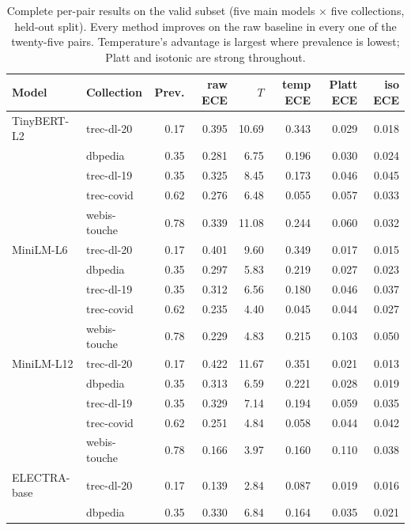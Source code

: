 \documentclass[sigconf,nonacm]{acmart}
\newcommand{\thead}[1]{\textbf{#1}}
\begin{document}
\begin{table}[t]
\centering
\caption{Complete per-pair results on the valid subset (five main models $\times$
five collections, held-out split). Every method improves on the raw baseline in every
one of the twenty-five pairs. Temperature's advantage is largest where prevalence is
lowest; Platt and isotonic are strong throughout.}\label{tab:full}
\small
\begin{tabular}{llrrrrrr}
\toprule
\thead{Model} & \thead{Collection} & \thead{Prev.} & \thead{raw ECE} & \thead{$T$} & \thead{temp ECE} & \thead{Platt ECE} & \thead{iso ECE} \\
\midrule
TinyBERT-L2 & trec-dl-20 & 0.17 & 0.395 & 10.69 & 0.343 & 0.029 & 0.018 \\
            & dbpedia    & 0.35 & 0.281 &  6.75 & 0.196 & 0.030 & 0.024 \\
            & trec-dl-19 & 0.35 & 0.325 &  8.45 & 0.173 & 0.046 & 0.045 \\
            & trec-covid & 0.62 & 0.276 &  6.48 & 0.055 & 0.057 & 0.033 \\
            & webis-touche & 0.78 & 0.339 & 11.08 & 0.244 & 0.060 & 0.032 \\
\midrule
MiniLM-L6   & trec-dl-20 & 0.17 & 0.401 &  9.60 & 0.349 & 0.017 & 0.015 \\
            & dbpedia    & 0.35 & 0.297 &  5.83 & 0.219 & 0.027 & 0.023 \\
            & trec-dl-19 & 0.35 & 0.312 &  6.56 & 0.180 & 0.046 & 0.037 \\
            & trec-covid & 0.62 & 0.235 &  4.40 & 0.045 & 0.044 & 0.027 \\
            & webis-touche & 0.78 & 0.229 &  4.83 & 0.215 & 0.103 & 0.050 \\
\midrule
MiniLM-L12  & trec-dl-20 & 0.17 & 0.422 & 11.67 & 0.351 & 0.021 & 0.013 \\
            & dbpedia    & 0.35 & 0.313 &  6.59 & 0.221 & 0.028 & 0.019 \\
            & trec-dl-19 & 0.35 & 0.329 &  7.14 & 0.194 & 0.059 & 0.035 \\
            & trec-covid & 0.62 & 0.251 &  4.84 & 0.058 & 0.044 & 0.042 \\
            & webis-touche & 0.78 & 0.166 &  3.97 & 0.160 & 0.110 & 0.038 \\
\midrule
ELECTRA-base& trec-dl-20 & 0.17 & 0.139 &  2.84 & 0.087 & 0.019 & 0.016 \\
            & dbpedia    & 0.35 & 0.330 &  6.84 & 0.164 & 0.035 & 0.021 \\

\end{tabular}
\end{table}
\end{document}
